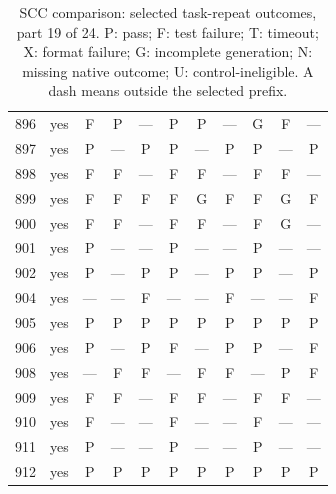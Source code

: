 \begin{table}[p]
\begin{tabular*}{\textwidth}{@{\extracolsep{\fill}}rc*{9}{c}@{}}
896 & yes & F & P & — & P & P & — & G & F & —\\
897 & yes & P & — & P & P & — & P & P & — & P\\
898 & yes & F & F & — & F & F & — & F & F & —\\
899 & yes & F & F & F & F & G & F & F & G & F\\
900 & yes & F & F & — & F & F & — & F & G & —\\
901 & yes & P & — & — & P & — & — & P & — & —\\
902 & yes & P & — & P & P & — & P & P & — & P\\
904 & yes & — & — & F & — & — & F & — & — & F\\
905 & yes & P & P & P & P & P & P & P & P & P\\
906 & yes & P & — & P & F & — & P & P & — & F\\
908 & yes & — & F & F & — & F & F & — & P & F\\
909 & yes & F & F & — & F & F & — & F & F & —\\
910 & yes & F & — & — & F & — & — & F & — & —\\
911 & yes & P & — & — & P & — & — & P & — & —\\
912 & yes & P & P & P & P & P & P & P & P & P\\
\bottomrule\end{tabular*}
\caption{SCC comparison: selected task-repeat outcomes, part 19 of 24. P: pass; F: test failure; T: timeout; X: format failure; G: incomplete generation; N: missing native outcome; U: control-ineligible. A dash means outside the selected prefix.}
\end{table}
\clearpage
